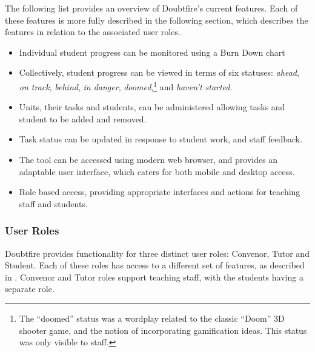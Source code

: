 The following list provides an overview of Doubtfire's current features. Each of these features is more fully described in the following section, which describes the features in relation to the associated user roles.
\begin{itemize}[noitemsep,nolistsep]
  \item Individual student progress can be monitored using a Burn Down chart
  \item Collectively, student progress can be viewed in terms of six statuses: \emph{ahead}, \emph{on track}, \emph{behind}, \emph{in danger}, \emph{doomed},\footnote{The ``doomed'' status was a wordplay related to the classic ``Doom'' 3D shooter game, and the notion of incorporating gamification ideas. This status was only visible to staff.} and \emph{haven't started}.
  \item Units, their tasks and students, can be administered allowing tasks and student to be added and removed.
  \item Task status can be updated in response to student work, and staff feedback. 
  \item The tool can be accessed using modern web browser, and provides an adaptable user interface, which caters for both mobile and desktop access.
  \item Role based access, providing appropriate interfaces and actions for teaching staff and students.
\end{itemize}


\subsubsection{User Roles} %
\label{sub:user_roles}

Doubtfire provides functionality for three distinct user roles: Convenor, Tutor and Student. Each of these roles has access to a different set of features, as described in . Convenor and Tutor roles support teaching staff, with the students having a separate role. 

